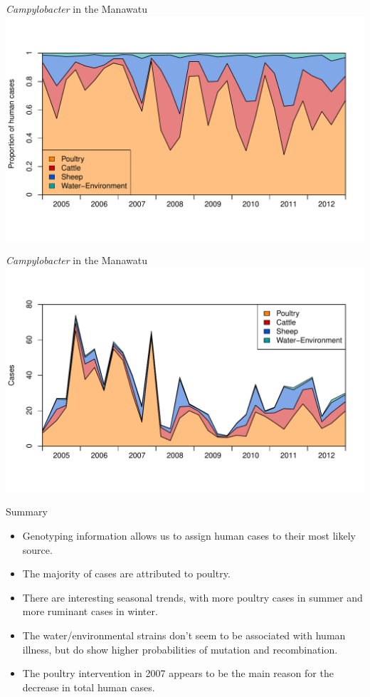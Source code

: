 \documentclass[]{beamer}
\begin{document}
\begin{frame}{\emph{Campylobacter} in the Manawatu}
\includegraphics[width=\textwidth, trim=40 0 40 0]{Pictures/island/proportions.pdf}
\end{frame}

\begin{frame}{\emph{Campylobacter} in the Manawatu}
\includegraphics[width=\textwidth, trim=40 0 40 0]{Pictures/island/totals.pdf}
\end{frame}

\begin{frame}{Summary}
\begin{itemize}
\item Genotyping information allows us to assign human cases to their most likely source.
\gap
\item The majority of cases are attributed to poultry.
\gap
\item There are interesting seasonal trends, with more poultry cases in summer and more ruminant cases in winter.
\gap
\item The water/environmental strains don't seem to be associated with human illness, but do show higher probabilities of mutation and recombination.
\gap
\item The poultry intervention in 2007 appears to be the main reason for the decrease in total human cases.
\end{itemize}
\end{frame}
\end{document}

